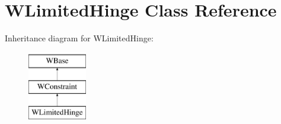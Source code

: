 \hypertarget{class_w_limited_hinge}{}\section{W\+Limited\+Hinge Class Reference}
\label{class_w_limited_hinge}
Inheritance diagram for W\+Limited\+Hinge\+:\begin{figure}[H]
\begin{center}
\leavevmode
\includegraphics[height=3.000000cm]{class_w_limited_hinge}
\end{center}
\end{figure}
